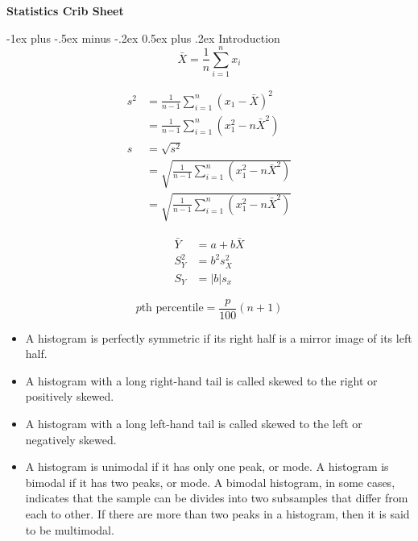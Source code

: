 \documentclass[9pt,landscape]{memoir}
\makeatletter
\renewcommand{\section}{\@startsection{section}{1}{0mm}%
                                {-1ex plus -.5ex minus -.2ex}%
                                {0.5ex plus .2ex}%
                                {\normalfont\large\bfseries}}
\makeatother
\begin{document}
\raggedright
\footnotesize
\begin{multicols}{3}


\setlength{\premulticols}{1pt}
\setlength{\postmulticols}{1pt}
\setlength{\multicolsep}{1pt}
\setlength{\columnsep}{2pt}

\begin{center}
     \Large{\textbf{Statistics Crib Sheet}} \\
\end{center}

\section{Introduction}
\begin{equation*}
    \bar{X} = \frac{1}{n} \sum _{i = 1} ^{n} x_i
\end{equation*}

\begin{align*}
    s^2 &= \frac{1}{n - 1} \sum _{i = 1} ^n \left( x_1 - \bar{X} \right)^2 \\
        &= \frac{1}{n - 1} \sum _{i = 1} ^n \left( x_1^2 - n\bar{X}^2 \right) \\
    s   &= \sqrt{s^2} \\
        &= \sqrt{\frac{1}{n - 1} \sum _{i = 1} ^n \left( x_1^2 - n\bar{X}^2 \right)} \\
        &= \sqrt{\frac{1}{n - 1} \sum _{i = 1} ^n \left( x_1^2 - n\bar{X}^2 \right)}
\end{align*}

\begin{align*}
    \bar{Y} &= a + b\bar{X} \\
    S^2_Y   &= b^2 s_X^2 \\
    S_Y     &= |b|s_x
\end{align*}

\begin{equation*}
    \text{$p$th percentile} = \frac{p}{100}\left( n +1 \right)
\end{equation*}

\begin{itemize}
    \item A histogram is perfectly symmetric if its right half is a mirror image of its left half.
    \item A histogram with a long right-hand tail is called skewed to the right or positively skewed.
    \item A histogram with a long left-hand tail is called skewed to the left or negatively skewed.
    \item A histogram is unimodal if it has only one peak, or mode. A histogram is bimodal if it has two peaks, or mode. A bimodal histogram, in some cases, indicates that the sample can be divides into two subsamples that differ from each to other. If there are more than two peaks in a histogram, then it is said to be multimodal.


\end{itemize}
\end{multicols}
\end{document}
